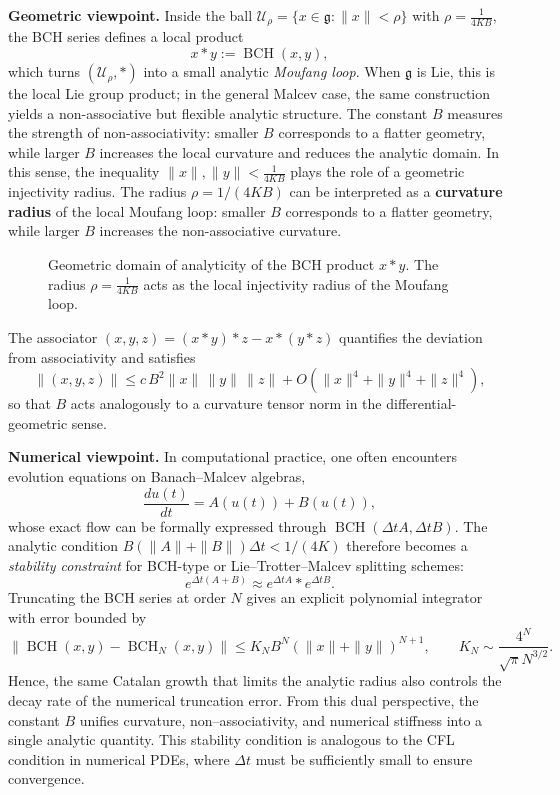 \documentclass[11pt]{amsart}
\numberwithin{equation}{section}
\theoremstyle{remark}
\newcommand{\BCH}{\operatorname{BCH}}
\begin{document}
\medskip
\noindent\textbf{Geometric viewpoint.}
Inside the ball $\mathcal U_\rho=\{x\in\mathfrak g:\|x\|<\rho\}$ with $\rho=\frac{1}{4KB}$, the BCH series defines a local product
\[
x*y:=\BCH(x,y),
\]
which turns $(\mathcal U_\rho,*)$ into a small analytic \emph{Moufang loop}.
When $\mathfrak g$ is Lie, this is the local Lie group product; in the general Malcev case, the same construction yields a non-associative but flexible analytic structure.
The constant $B$ measures the strength of non-associativity: smaller $B$ corresponds to a flatter geometry, while larger $B$ increases the local curvature and reduces the analytic domain.
In this sense, the inequality $\|x\|,\|y\|<\frac{1}{4KB}$ plays the role of a geometric injectivity radius.
The radius $\rho = 1/(4KB)$ can be interpreted as a \textbf{curvature radius} of the local Moufang loop: smaller $B$ corresponds to a flatter geometry, while larger $B$ increases the non-associative curvature.

\begin{figure}[htbp]
\centering
{}
\caption{Geometric domain of analyticity of the BCH product $x * y$. The radius $\rho = \frac{1}{4KB}$ acts as the local injectivity radius of the Moufang loop.}
\label{fig:geometric-domain}
\end{figure}

The associator $(x,y,z)=(x*y)*z-x*(y*z)$ quantifies the deviation from associativity and satisfies
\[
\|(x,y,z)\|\le c\,B^2\|x\|\,\|y\|\,\|z\| + O(\|x\|^4+\|y\|^4+\|z\|^4),
\]
so that $B$ acts analogously to a curvature tensor norm in the differential-geometric sense.

\medskip
\noindent\textbf{Numerical viewpoint.}
In computational practice, one often encounters evolution equations on Banach--Malcev algebras,
\[
\frac{du(t)}{dt}=A(u(t))+B(u(t)),
\]
whose exact flow can be formally expressed through $\BCH(\Delta t A,\Delta t B)$.
The analytic condition $B(\|A\|+\|B\|)\Delta t<1/(4K)$ therefore becomes a \emph{stability constraint} for BCH-type or Lie--Trotter--Malcev splitting schemes:
\[
e^{\Delta t(A+B)}\approx e^{\Delta tA}*e^{\Delta tB}.
\]
Truncating the BCH series at order $N$ gives an explicit polynomial integrator with error bounded by
\[
\|\BCH(x,y)-\BCH_N(x,y)\|\le K_N B^N(\|x\|+\|y\|)^{N+1},\qquad K_N\sim\frac{4^N}{\sqrt{\pi}N^{3/2}}.
\]
Hence, the same Catalan growth that limits the analytic radius also controls the decay rate of the numerical truncation error.
From this dual perspective, the constant $B$ unifies curvature, non--associativity, and numerical stiffness into a single analytic quantity. This stability condition is analogous to the CFL condition in numerical PDEs, where $\Delta t$ must be sufficiently small to ensure convergence.
\end{document}
